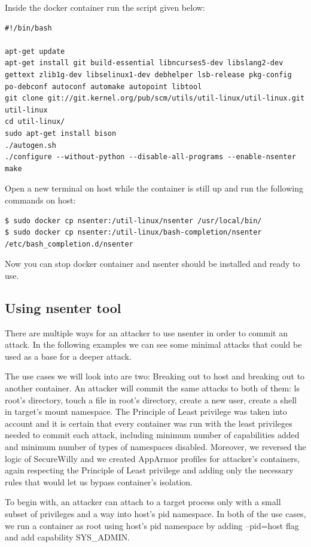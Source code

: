 Inside the docker container run the script given below:
\begin{lstlisting}[style=bashscript, caption={Script to run inside docker container nsenter}]
#!/bin/bash

apt-get update
apt-get install git build-essential libncurses5-dev libslang2-dev gettext zlib1g-dev libselinux1-dev debhelper lsb-release pkg-config po-debconf autoconf automake autopoint libtool
git clone git://git.kernel.org/pub/scm/utils/util-linux/util-linux.git util-linux
cd util-linux/
sudo apt-get install bison
./autogen.sh
./configure --without-python --disable-all-programs --enable-nsenter
make
\end{lstlisting}

Open a new terminal on host while the container is still up and run the following commands on host:

\begin{lstlisting}[style=terminal]
$ sudo docker cp nsenter:/util-linux/nsenter /usr/local/bin/
$ sudo docker cp nsenter:/util-linux/bash-completion/nsenter /etc/bash_completion.d/nsenter
\end{lstlisting}

Now you can stop docker container and nsenter should be installed and ready to use.

\subsection{Using nsenter tool}
There are multiple ways for an attacker to use nsenter in order to commit an attack. In the following examples we can see some minimal attacks that could be used as a base for a deeper attack.

The use cases we will look into are two: Breaking out to host and breaking out to another container. An attacker will commit the same attacks to both of them: ls root's directory, touch a file in root's directory, create a new user, create a shell in target's mount namespace.
The Principle of Least privilege was taken into account and it is certain that every container was run with the least privileges needed to commit each attack, including minimum number of capabilities added and minimum number of types of namespaces disabled.
Moreover, we reversed the logic of SecureWilly and we created AppArmor profiles for attacker's containers, again respecting the Principle of Least privilege and adding only the necessary rules that would let us bypass container's isolation. 

To begin with, an attacker can attach to a target process only with a small subset of privileges and a way into host's pid namespace. In both of the use cases, we run a container as root using host's pid namespace by adding --pid=host flag and add capability SYS\_ADMIN.

